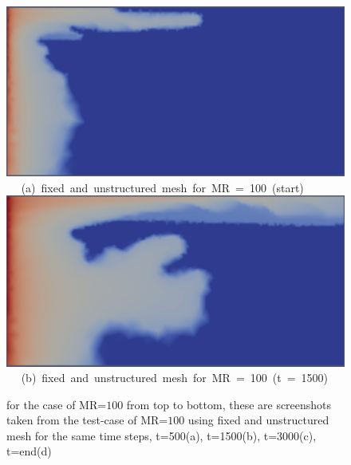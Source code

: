 \begin{figure}[ht] 
\vbox{
\hbox{\hspace{3.5cm}
\includegraphics[width=.5\textwidth]{./Pics1/mr100_fixed/mr100_fixed_500.pdf} 
}
\vspace{0.0cm}
\hbox{\hspace{5.0cm} (a) fixed and unstructured mesh for MR = 100 (start)   
}
\hbox{\hspace{3.5cm}
\includegraphics[width=.5\textwidth]{./Pics1/mr100_fixed/mr100_fixed_1500.pdf}
}
\vspace{0.0cm}
\hbox{\hspace{5.0cm} (b) fixed and unstructured mesh for MR = 100 (t = 1500)   
}
}     
\caption{for the case of MR=$100$ from top to bottom, these are screenshots taken from the test-case of MR=$100$ using fixed and unstructured mesh for the same time steps, t=500(a), t=1500(b), t=3000(c), t=end(d) }
\label{fig:4testcase_a}
\end{figure}



